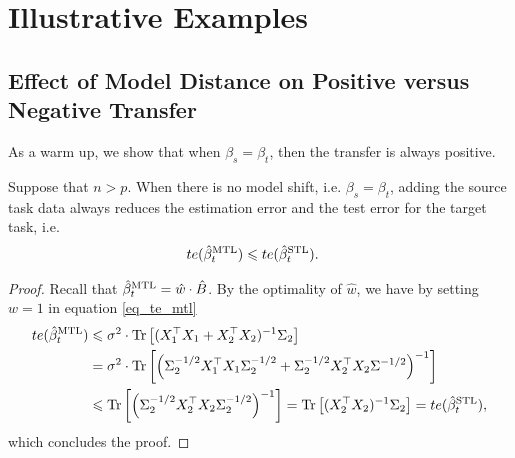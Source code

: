 \section{Illustrative Examples}

\subsection{Effect of Model Distance on Positive versus Negative Transfer}

As a warm up, we show that when $\beta_s = \beta_t$, then the transfer is always positive.

\begin{proposition}\label{prop_monotone}
	Suppose that $n > p$.
  When there is no model shift, i.e. $\beta_s = \beta_t$, adding the source task data always reduces the estimation error and the test error for the target task, i.e.
	\begin{align}
		te(\hat{\beta}_{t}^{\text{MTL}}) &\leqslant te(\hat{\beta}_t^{\text{STL}}). \label{eq_mono_te}
	\end{align}
\end{proposition}

\begin{proof}
	Recall that $\hat{\beta}_t^{\text{MTL}} = \hat{w} \cdot \hat{B}$.
	By the optimality of $\hat{w}$, we have by setting $w = 1$ in equation \eqref{eq_te_mtl}
	\begin{align*}
		te(\hat{\beta}_t^{\text{MTL}}) &\leqslant \sigma^2 \cdot \operatorname{Tr}\left[(X_1^{\top}X_1 + X_2^{\top}X_2)^{-1}\Sigma_2\right] \\
		&= \sigma^2 \cdot \operatorname{Tr}\left[\left({\Sigma_2^{-1/2}X_1^{\top}X_1\Sigma_2^{-1/2} + \Sigma_2^{-1/2}X_2^{\top}X_2\Sigma^{-1/2}}\right)^{-1}\right] \\
		&\leqslant \operatorname{Tr}\left[\left({\Sigma_2^{-1/2}X_2^{\top}X_2\Sigma_2^{-1/2}}\right)^{-1}\right]
			= \operatorname{Tr}\left[(X_2^{\top}X_2)^{-1} \Sigma_2\right] = te(\hat{\beta}_t^{\text{STL}}),
	\end{align*}
	which concludes the proof.
\end{proof}

